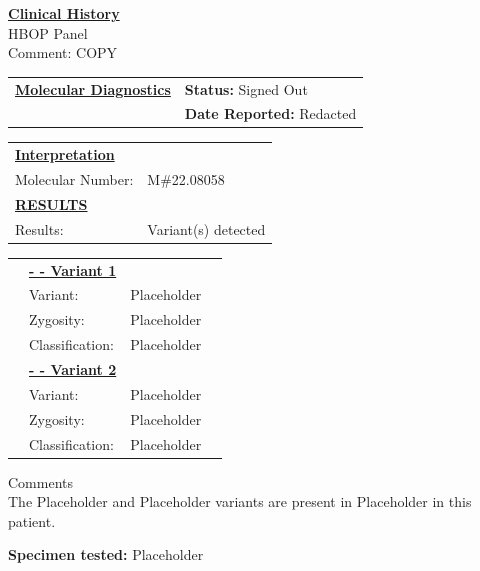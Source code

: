 \documentclass[11pt]{extarticle}
\begin{document}
\begin{raggedright}{\bf \underline{Clinical History}}\\
HBOP Panel \\
Comment: COPY
\end{raggedright}

\begin{tabular}{p{10 cm} p{4.5cm}}
{\bf \underline{Molecular Diagnostics}} & {\bf Status:} Signed Out \\
& {\bf Date Reported:} Redacted
\end{tabular}
\newline
\begin{tabular}{p{4cm} p{4 cm}}
\underline{\bf Interpretation} & \\
Molecular Number: & M\#22.08058 \\
{\bf \underline {RESULTS}} & \\
Results: & Variant(s) detected
\end {tabular}

\begin{tabular}{p{0cm} p{2 cm}p{2cm} p{10cm}}\\
& {\bf \underline{- - Variant 1}} & \\
& Variant: & Placeholder \\
& Zygosity: & Placeholder \\
& Classification: & Placeholder\\
& {\bf \underline{- - Variant 2}} & \\
& Variant: & Placeholder \\
& Zygosity: & Placeholder \\
& Classification: & Placeholder
\end{tabular}

\begin{flushleft}
Comments \\
The Placeholder and Placeholder variants are present in Placeholder in this patient. 
\end{flushleft}

\thispagestyle{empty} %
\pagestyle{fancy}

\begin{flushleft}
{\bf Specimen tested: } Placeholder
\end{flushleft}
\end{document}
